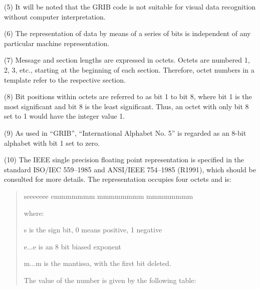 (5) It will be noted that the GRIB code is not suitable for visual data recognition without computer interpretation.

(6) The representation of data by means of a series of bits is independent of any particular machine representation.

(7) Message and section lengths are expressed in octets. Octets are numbered 1, 2, 3, etc., starting at the beginning of each section. Therefore, octet numbers in a template refer to the respective section.

(8) Bit positions within octets are referred to as bit 1 to bit 8, where bit 1 is the most significant and bit 8 is the least significant. Thus, an octet with only bit 8 set to 1 would have the integer value 1.

(9) As used in ``GRIB'', ``International Alphabet No. 5'' is regarded as an 8-bit alphabet with bit 1 set to zero.

(10) The IEEE single precision floating point representation is specified in the standard ISO/IEC 559--1985 and ANSI/IEEE 754--1985 (R1991), which should be consulted for more details. The representation occupies four octets and is:

\begin{quote}
seeeeeee emmmmmmm mmmmmmmm mmmmmmmm

where:

s is the sign bit, 0 means positive, 1 negative

e...e is an 8 bit biased exponent

m...m is the mantissa, with the first bit deleted.

The value of the number is given by the following table:
\end{quote}


